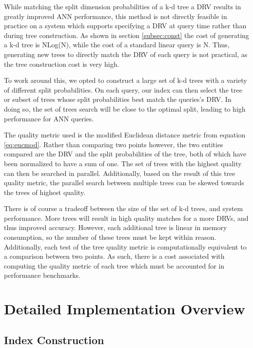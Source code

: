 While matching the split dimension probabilities of a k-d tree a DRV results in greatly improved ANN performance, this method is not directly feasible in practice on a system which supports specifying a DRV at query time rather than during tree construction.  As shown in section \ref{subsec:const} the cost of generating a k-d tree is NLog(N), while the cost of a standard linear query is N.  Thus, generating new trees to directly match the DRV of each query is not practical, as the tree construction cost is very high.

To work around this, we opted to construct a large set of k-d trees with a variety of different split probabilities.  On each query, our index can then select the tree or subset of trees whose split probabilities best match the queries's DRV.  In doing so, the set of trees search will be close to the optimal split, leading to high performance for ANN queries.

The quality metric used is the modified Euclidean distance metric from equation \ref{eq:eucmod}.  Rather than comparing two points however, the two entities compared are the DRV and the split probabilities of the tree, both of which have been normalized to have a sum of one.  The set of trees with the highest quality can then be searched in parallel.  Additionally, based on the result of this tree quality metric, the parallel search between multiple trees can be skewed towards the trees of highest quality.

There is of course a tradeoff between the size of the set of k-d trees, and system performance.  More trees will result in high quality matches for a more DRVs, and thus improved accuracy.  However, each additional tree is linear in memory consumption, so the number of these trees must be kept within reason.  Additionally, each test of the tree quality metric is computationally equivalent to a comparison between two points.  As such, there is a cost associated with computing the quality metric of each tree which must be accounted for in performance benchmarks.

\section{Detailed Implementation Overview}

\subsection{Index Construction}


